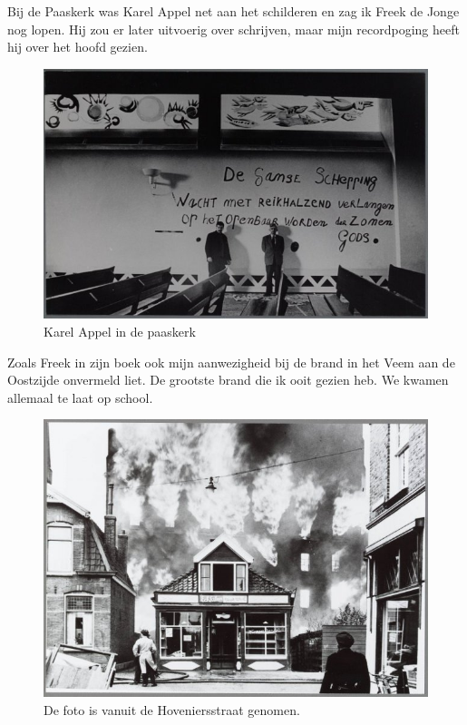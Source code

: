 \documentclass[10pt,twoside, openright]{memoir}
\begin{document}
Bij de Paaskerk was Karel Appel net aan het schilderen en zag ik Freek de Jonge nog lopen. Hij zou er later uitvoerig over schrijven, maar mijn recordpoging heeft hij over het hoofd gezien. 

\begin{figure}
\includegraphics[width=\textwidth]{img/81paaskerk}
\caption*{\footnotesize Karel Appel in de paaskerk}
\end{figure}

Zoals Freek in zijn boek ook mijn aanwezigheid bij de brand in het Veem aan de Oostzijde onvermeld liet. De grootste brand die ik ooit gezien heb. We kwamen allemaal te laat op school. 

\begin{figure}
\includegraphics[width=\textwidth]{img/81veembrand}
\caption*{\footnotesize De foto is vanuit de Hoveniersstraat genomen.}
\end{figure}
\end{document}

